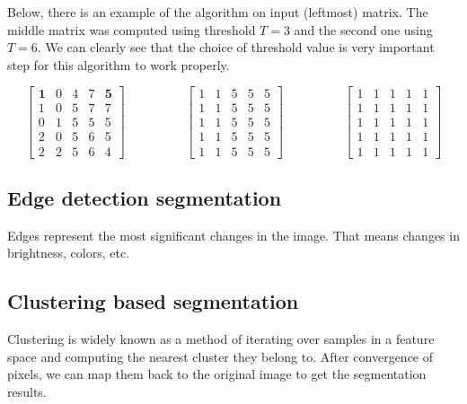 Below, there is an example of the algorithm on input (leftmost) matrix. The middle
matrix was computed using threshold $T=3$ and the second one using $T=6$. We can clearly
see that the choice of threshold value is very important step for this algorithm
to work properly. \cite{yuheng2017image}

$$\begin{bmatrix}
\textbf{1} & 0 & 4 & 7 & \textbf{5} \\
1 & 0 & 5 & 7 & 7 \\
0 & 1 & 5 & 5 & 5 \\
2 & 0 & 5 & 6 & 5 \\
2 & 2 & 5 & 6 & 4
\end{bmatrix}
\hspace{2cm}
\begin{bmatrix}
1 & 1 & 5 & 5 & 5 \\
1 & 1 & 5 & 5 & 5 \\
1 & 1 & 5 & 5 & 5 \\
1 & 1 & 5 & 5 & 5 \\
1 & 1 & 5 & 5 & 5
\end{bmatrix}
\hspace{2cm}
\begin{bmatrix}
1 & 1 & 1 & 1 & 1 \\
1 & 1 & 1 & 1 & 1 \\
1 & 1 & 1 & 1 & 1 \\
1 & 1 & 1 & 1 & 1 \\
1 & 1 & 1 & 1 & 1
\end{bmatrix}
$$

\subsection{Edge detection segmentation}
\label{sec:image_segmentation:edge_based}

Edges represent the most significant changes in the image. That means changes in
brightness, colors, etc. 

\cite{yuheng2017image}

\subsection{Clustering based segmentation}
\label{sec:image_segmentation:cluster_based}

Clustering is widely known as a method of iterating over samples in a feature space
and computing the nearest cluster they belong to. After convergence of pixels,
we can map them back to the original image to get the segmentation results.

